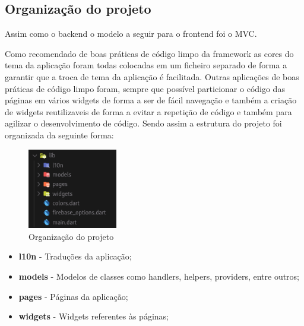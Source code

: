 \subsection{Organização do projeto}
Assim como o backend o modelo a seguir para o frontend foi o MVC. 

Como recomendado de boas práticas de código limpo da framework as cores do tema da aplicação foram todas colocadas em um ficheiro separado de forma a garantir que a troca de tema da aplicação é facilitada. Outras aplicações de boas práticas de código limpo foram, sempre que possível particionar o código das páginas em vários widgets de forma a ser de fácil navegação e também a criação de widgets reutilizaveis de forma a evitar a repetição de código e também para agilizar o desenvolvimento de código. Sendo assim a estrutura do projeto foi organizada da seguinte forma:
\begin{figure}[htb]
  \centering
  \includegraphics[width=0.35\textwidth]{images/implementacao/frontend/organizacao_projeto.png}
  \caption{Organização do projeto}
  \label{fig:69}
\end{figure}

\begin{itemize}
  \item \textbf{l10n} - Traduções da aplicação;
  \item \textbf{models} - Modelos de classes como handlers, helpers, providers, entre outros;
  \item \textbf{pages} - Páginas da aplicação;
  \item \textbf{widgets} - Widgets referentes às páginas;
\end{itemize}
\vspace{60mm}

